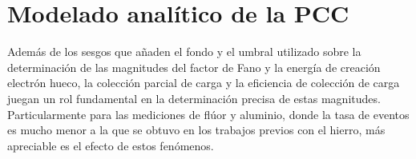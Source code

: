 \chapter{Modelado analítico de la PCC \label{chap:ModeloPCC}}
\noindent Además de los sesgos que añaden el fondo y el umbral utilizado sobre la determinación de las magnitudes del factor de Fano y la energía de creación electrón hueco, la colección parcial de carga y la eficiencia de colección de carga juegan un rol fundamental en la determinación precisa de estas magnitudes. Particularmente para las mediciones de flúor y aluminio, donde la tasa de eventos es mucho menor a la que se obtuvo en los trabajos previos\cite{TesisAndi,TesisKevin,Rodrigues} con el hierro, más apreciable es el efecto de estos fenómenos.
